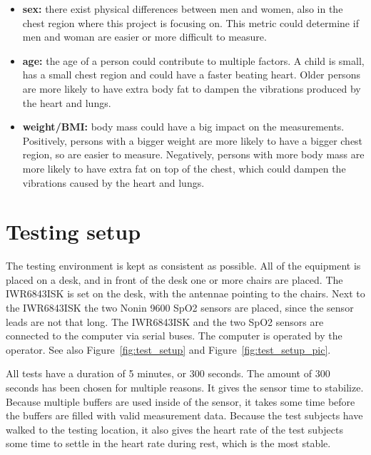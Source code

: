 \begin{itemize}
    \item \textbf{sex:} there exist physical differences between men and women, also in the chest region where this project is focusing on. This metric could determine if men and woman are easier or more difficult to measure.
    \item \textbf{age:} the age of a person could contribute to multiple factors. A child is small, has a small chest region and could have a faster beating heart. Older persons are more likely to have extra body fat to dampen the vibrations produced by the heart and lungs.
    \item \textbf{weight/BMI:} body mass could have a big impact on the measurements. Positively, persons with a bigger weight are more likely to have a bigger chest region, so are easier to measure. Negatively, persons with more body mass are more likely to have extra fat on top of the chest, which could dampen the vibrations caused by the heart and lungs.
\end{itemize}

\section{Testing setup}
\label{sec:test_setup}
The testing environment is kept as consistent as possible. All of the equipment is placed on a desk, and in front of the desk one or more chairs are placed. The IWR6843ISK is set on the desk, with the antennae pointing to the chairs. Next to the IWR6843ISK the two Nonin 9600 SpO2 sensors are placed, since the sensor leads are not that long. The IWR6843ISK and the two SpO2 sensors are connected to the computer via serial buses. The computer is operated by the operator. See also Figure~\ref{fig:test_setup} and Figure~\ref{fig:test_setup_pic}.

All tests have a duration of 5 minutes, or 300 seconds. The amount of 300 seconds has been chosen for multiple reasons. It gives the sensor time to stabilize. Because multiple buffers are used inside of the sensor, it takes some time before the buffers are filled with valid measurement data. Because the test subjects have walked to the testing location, it also gives the heart rate of the test subjects some time to settle in the heart rate during rest, which is the most stable.

